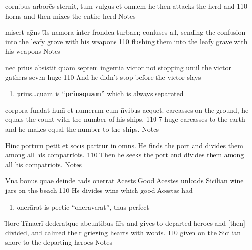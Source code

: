 \latline
  {cornibus arbore\={\macron {\i}}s sternit, tum vulgus et omnem}
  { he then attacks the herd and  }
  {110}
  { horns and then mixes the entire herd }
  { Notes }


\latline
  {miscet ag\={}ns t\={}l\={\macron {\i}}s nemora inter frondea turbam;}
  { confuses all, sending the confusion into the leafy grove with his weapons }
  {110}
  { flushing them into the leafy grave with his weapons }
  { Notes }


\latline
  {nec prius absistit quam septem ingentia victor }
  { not stopping until the victor gathers seven huge }
  {110}
  { And he didn't stop before the victor slays }
  { \begin{enumerate}
  	\item prius{\ldots}quam is ``\textbf{priusquam}'' which is always separated
  \end{enumerate} }



\latline
  {corpora fundat hum\={\macron {\i}} et numerum cum n\={}vibus aequet.}
  { carcasses on the ground, he equals the count with the number of his ships. }
  {110}
  { 7 huge carcasses to the earth and he makes equal the number to the ships. }
  { Notes }


\latline
  {Hinc portum petit et soci\={}s part\={\macron {\i}}tur in omn\={\macron {\i}}s.}
  { He finds the port and divides them among all his compatriots. }
  {110}
  { Then he seeks the port and divides them among all his compatriots. }
  { Notes }


\latline
  {V\={\macron {\i}}na bonus quae deinde cad\={\macron {\i}}s oner\={}rat Acest\={}s}
  { Good Acestes unloads Sicilian wine jars on the beach }
  {110}
  { He divides wine which good Acestes had  }
  { \begin{enumerate}
  	\item oner\={a}rat is poetic ``oneraverat'', thus perfect
  \end{enumerate} }



\latline
  {l\={\macron {\i}}tore Tr\={\macron {\i}}nacri\={} dederatque abeuntibus h\={}r\={}s}
  { and gives to departed heroes and [then] divided, and calmed their grieving hearts with words. }
  {110}
  { given on the Sicilian shore to the departing heroes }
  { Notes }